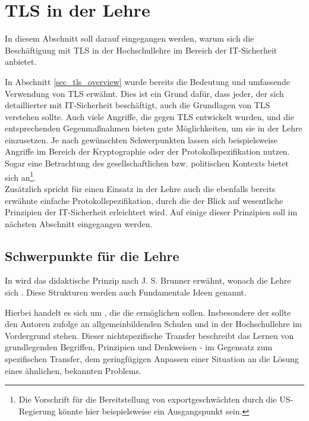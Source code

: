 \chapter{TLS in der Lehre}
\label{cha_tls_teaching}

In diesem Abschnitt soll darauf eingegangen werden, warum sich die Beschäftigung mit TLS in der Hochschullehre im Bereich der IT-Sicherheit anbietet. %

In Abschnitt \ref{sec_tls_overview} wurde bereits die Bedeutung und umfassende Verwendung von TLS erwähnt. Dies ist ein Grund dafür, dass jeder, der sich detaillierter mit IT-Sicherheit beschäftigt, auch die Grundlagen von TLS verstehen sollte. Auch viele Angriffe, die gegen TLS entwickelt wurden, und die entsprechenden Gegenmaßnahmen bieten gute Möglichkeiten, um sie in der Lehre einzusetzen. Je nach gewünschten Schwerpunkten lassen sich beispielsweise Angriffe im Bereich der Kryptographie oder der Protokollspezifikation nutzen. Sogar eine Betrachtung des gesellschaftlichen bzw. politischen Kontexts bietet sich an\footnote{Die Vorschrift für die Bereitstellung von exportgeschwächten \ciphersuites{} durch die US-Regierung könnte hier beispielsweise ein Ausgangspunkt sein.}. \\
Zusätzlich spricht für einen Einsatz in der Lehre auch die ebenfalls bereits erwähnte einfache Protokollspezifikation, durch die der Blick auf wesentliche Prinzipien der IT-Sicherheit erleichtert wird. Auf einige dieser Prinzipien soll im nächsten Abschnitt eingegangen werden.

\section{Schwerpunkte für die Lehre}

In \cite{schubert11} wird das didaktische Prinzip nach J. S. Brunner erwähnt, wonach die Lehre sich . Diese Strukturen werden auch Fundamentale Ideen genannt.

Hierbei handelt es sich um , die die  \cite{schubert11} ermöglichen sollen. Insbesondere der  sollte den Autoren zufolge an allgemeinbildenden Schulen und in der Hochschullehre im Vordergrund stehen. Dieser nicht\-spe\-zi\-fische Transfer beschreibt das Lernen von grundlegenden Begriffen, Prinzipien und Denkweisen - im Gegensatz zum spezifischen Transfer, dem geringfügigen Anpassen einer Situation an die Lösung eines ähnlichen, bekannten Problems.

